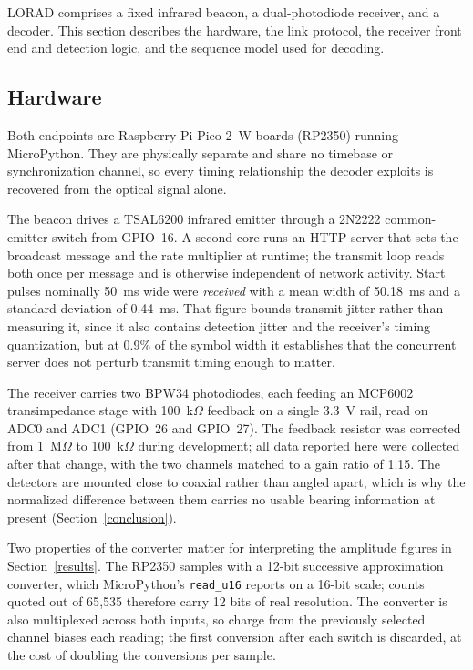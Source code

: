 LORAD comprises a fixed infrared beacon, a dual-photodiode receiver, and a
decoder. This section describes the hardware, the link protocol, the receiver
front end and detection logic, and the sequence model used for decoding.

\subsection{Hardware}\label{sec:hardware}

Both endpoints are Raspberry Pi Pico 2~W boards (RP2350) running MicroPython.
They are physically separate and share no timebase or synchronization channel,
so every timing relationship the decoder exploits is recovered from the optical
signal alone.

The beacon drives a TSAL6200 infrared emitter through a 2N2222 common-emitter
switch from GPIO~16. A second core runs an HTTP server
that sets the broadcast message and the rate multiplier at runtime; the
transmit loop reads both once per message and is otherwise independent of
network activity. Start pulses nominally 50~ms wide were \emph{received} with a
mean width of 50.18~ms and a standard deviation of 0.44~ms. That figure bounds
transmit jitter rather than measuring it, since it also contains detection
jitter and the receiver's timing quantization, but at 0.9\% of the symbol width
it establishes that the concurrent server does not perturb transmit timing
enough to matter.

The receiver carries two BPW34 photodiodes, each feeding an MCP6002
transimpedance stage with 100~k$\Omega$ feedback on a single 3.3~V rail, read
on ADC0 and ADC1 (GPIO~26 and GPIO~27). The feedback resistor was corrected
from 1~M$\Omega$ to 100~k$\Omega$ during development; all data reported here
were collected after that change, with the two channels matched to a gain ratio
of 1.15. The detectors are mounted close to coaxial rather than angled apart,
which is why the normalized difference between them carries no usable bearing
information at present (Section~\ref{conclusion}).

Two properties of the converter matter for interpreting the amplitude figures
in Section~\ref{results}. The RP2350 samples with a 12-bit successive
approximation converter, which MicroPython's \texttt{read\_u16} reports on a
16-bit scale; counts quoted out of 65{,}535 therefore carry 12 bits of real
resolution. The converter is also multiplexed across both inputs, so charge
from the previously selected channel biases each reading; the first conversion
after each switch is discarded, at the cost of doubling the conversions per
sample.


